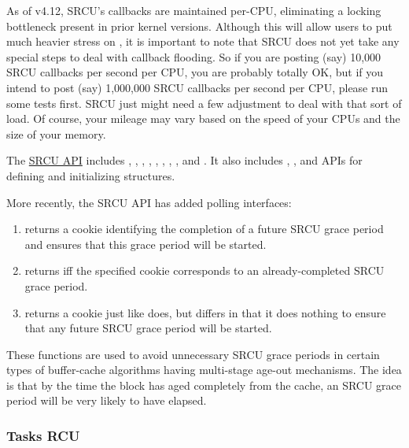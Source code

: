 As of v4.12, SRCU's callbacks are maintained per-CPU, eliminating a
locking bottleneck present in prior kernel versions.
Although this will
allow users to put much heavier stress on , it is
important to note that SRCU does not yet take any special steps to deal
with callback flooding. So if you are posting (say) 10,000 SRCU
callbacks per second per CPU, you are probably totally OK, but if you
intend to post (say) 1,000,000 SRCU callbacks per second per CPU, please
run some tests first.
SRCU just might need a few adjustment to deal with
that sort of load.
Of course, your mileage may vary based on the speed
of your CPUs and the size of your memory.

The \href{https://lwn.net/Articles/609973/#RCU%20Per-Flavor%20API%20Table}{SRCU API}
includes , ,
, ,
, ,
, , and .
It
also includes , , and
 APIs for defining and initializing
 structures.

More recently, the SRCU API has added polling interfaces:

\begin{enumerate}
\item {} returns a cookie identifying
   the completion of a future SRCU grace period and ensures
   that this grace period will be started.
\item {} returns  iff the
   specified cookie corresponds to an already-completed
   SRCU grace period.
\item {} returns a cookie just like
    does, but differs in that
   it does nothing to ensure that any future SRCU grace period
   will be started.
\end{enumerate}

These functions are used to avoid unnecessary SRCU grace periods in
certain types of buffer-cache algorithms having multi-stage age-out
mechanisms.
The idea is that by the time the block has aged completely
from the cache, an SRCU grace period will be very likely to have elapsed.


\subsubsection{Tasks RCU}

